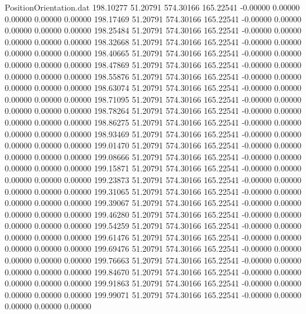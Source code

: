 \begin{filecontents}{PositionOrientation.dat}
 198.10277   51.20791  574.30166   165.22541   -0.00000    0.00000    0.00000    0.00000    0.00000
 198.17469   51.20791  574.30166   165.22541   -0.00000    0.00000    0.00000    0.00000    0.00000
 198.25484   51.20791  574.30166   165.22541   -0.00000    0.00000    0.00000    0.00000    0.00000
 198.32668   51.20791  574.30166   165.22541   -0.00000    0.00000    0.00000    0.00000    0.00000
 198.40665   51.20791  574.30166   165.22541   -0.00000    0.00000    0.00000    0.00000    0.00000
 198.47869   51.20791  574.30166   165.22541   -0.00000    0.00000    0.00000    0.00000    0.00000
 198.55876   51.20791  574.30166   165.22541   -0.00000    0.00000    0.00000    0.00000    0.00000
 198.63074   51.20791  574.30166   165.22541   -0.00000    0.00000    0.00000    0.00000    0.00000
 198.71095   51.20791  574.30166   165.22541   -0.00000    0.00000    0.00000    0.00000    0.00000
 198.78264   51.20791  574.30166   165.22541   -0.00000    0.00000    0.00000    0.00000    0.00000
 198.86275   51.20791  574.30166   165.22541   -0.00000    0.00000    0.00000    0.00000    0.00000
 198.93469   51.20791  574.30166   165.22541   -0.00000    0.00000    0.00000    0.00000    0.00000
 199.01470   51.20791  574.30166   165.22541   -0.00000    0.00000    0.00000    0.00000    0.00000
 199.08666   51.20791  574.30166   165.22541   -0.00000    0.00000    0.00000    0.00000    0.00000
 199.15871   51.20791  574.30166   165.22541   -0.00000    0.00000    0.00000    0.00000    0.00000
 199.23873   51.20791  574.30166   165.22541   -0.00000    0.00000    0.00000    0.00000    0.00000
 199.31065   51.20791  574.30166   165.22541   -0.00000    0.00000    0.00000    0.00000    0.00000
 199.39067   51.20791  574.30166   165.22541   -0.00000    0.00000    0.00000    0.00000    0.00000
 199.46280   51.20791  574.30166   165.22541   -0.00000    0.00000    0.00000    0.00000    0.00000
 199.54259   51.20791  574.30166   165.22541   -0.00000    0.00000    0.00000    0.00000    0.00000
 199.61476   51.20791  574.30166   165.22541   -0.00000    0.00000    0.00000    0.00000    0.00000
 199.69476   51.20791  574.30166   165.22541   -0.00000    0.00000    0.00000    0.00000    0.00000
 199.76663   51.20791  574.30166   165.22541   -0.00000    0.00000    0.00000    0.00000    0.00000
 199.84670   51.20791  574.30166   165.22541   -0.00000    0.00000    0.00000    0.00000    0.00000
 199.91863   51.20791  574.30166   165.22541   -0.00000    0.00000    0.00000    0.00000    0.00000
 199.99071   51.20791  574.30166   165.22541   -0.00000    0.00000    0.00000    0.00000    0.00000

\end{filecontents}
